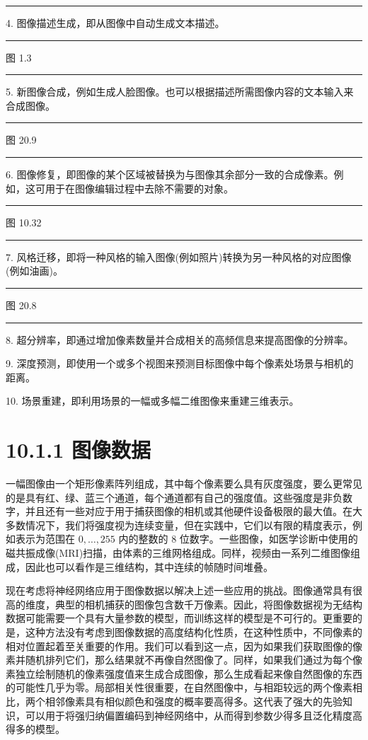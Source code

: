 \documentclass[10pt]{report}
\newcommand{\HRule}{\begin{center}\rule{0.9\linewidth}{0.2mm}\end{center}}
\begin{document}
\HRule

4. 图像描述生成，即从图像中自动生成文本描述。

\HRule

图 1.3

\HRule

5. 新图像合成，例如生成人脸图像。也可以根据描述所需图像内容的文本输入来合成图像。

\HRule

图 20.9

\HRule

6. 图像修复，即图像的某个区域被替换为与图像其余部分一致的合成像素。例如，这可用于在图像编辑过程中去除不需要的对象。

\HRule

图 10.32

\HRule

7. 风格迁移，即将一种风格的输入图像(例如照片)转换为另一种风格的对应图像(例如油画)。

\HRule

图 20.8

\HRule

8. 超分辨率，即通过增加像素数量并合成相关的高频信息来提高图像的分辨率。

9. 深度预测，即使用一个或多个视图来预测目标图像中每个像素处场景与相机的距离。

10. 场景重建，即利用场景的一幅或多幅二维图像来重建三维表示。

\section*{10.1.1 图像数据}

一幅图像由一个矩形像素阵列组成，其中每个像素要么具有灰度强度，要么更常见的是具有红、绿、蓝三个通道，每个通道都有自己的强度值。这些强度是非负数字，并且还有一些对应于用于捕获图像的相机或其他硬件设备极限的最大值。在大多数情况下，我们将强度视为连续变量，但在实践中，它们以有限的精度表示，例如表示为范围在 \(0,\ldots ,{255}\) 内的整数的 8 位数字。一些图像，如医学诊断中使用的磁共振成像(MRI)扫描，由体素的三维网格组成。同样，视频由一系列二维图像组成，因此也可以看作是三维结构，其中连续的帧随时间堆叠。

现在考虑将神经网络应用于图像数据以解决上述一些应用的挑战。图像通常具有很高的维度，典型的相机捕获的图像包含数千万像素。因此，将图像数据视为无结构数据可能需要一个具有大量参数的模型，而训练这样的模型是不可行的。更重要的是，这种方法没有考虑到图像数据的高度结构化性质，在这种性质中，不同像素的相对位置起着至关重要的作用。我们可以看到这一点，因为如果我们获取图像的像素并随机排列它们，那么结果就不再像自然图像了。同样，如果我们通过为每个像素独立绘制随机的像素强度值来生成合成图像，那么生成看起来像自然图像的东西的可能性几乎为零。局部相关性很重要，在自然图像中，与相距较远的两个像素相比，两个相邻像素具有相似颜色和强度的概率要高得多。这代表了强大的先验知识，可以用于将强归纳偏置编码到神经网络中，从而得到参数少得多且泛化精度高得多的模型。
\end{document}
